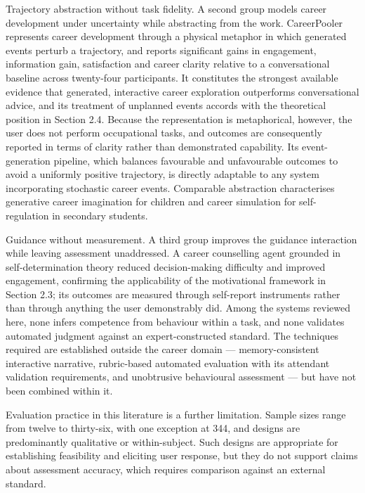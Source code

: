 Trajectory abstraction without task fidelity. A second group models career development under uncertainty while abstracting from the work. CareerPooler\cite{r79} represents career development through a physical metaphor in which generated events perturb a trajectory, and reports significant gains in engagement, information gain, satisfaction and career clarity relative to a conversational baseline across twenty-four participants. It constitutes the strongest available evidence that generated, interactive career exploration outperforms conversational advice, and its treatment of unplanned events accords with the theoretical position in Section 2.4. Because the representation is metaphorical, however, the user does not perform occupational tasks, and outcomes are consequently reported in terms of clarity rather than demonstrated capability. Its event-\allowbreak{}generation pipeline, which balances favourable and unfavourable outcomes to avoid a uniformly positive trajectory, is directly adaptable to any system incorporating stochastic career events. Comparable abstraction characterises generative career imagination for children\cite{r80} and career simulation for self-\allowbreak{}regulation in secondary students\cite{r81}.

Guidance without measurement. A third group improves the guidance interaction while leaving assessment unaddressed. A career counselling agent grounded in self-\allowbreak{}determination theory\cite{r82} reduced decision-\allowbreak{}making difficulty and improved engagement, confirming the applicability of the motivational framework in Section 2.3; its outcomes are measured through self-report instruments rather than through anything the user demonstrably did. Among the systems reviewed here, none infers competence from behaviour within a task, and none validates automated judgment against an expert-\allowbreak{}constructed standard. The techniques required are established outside the career domain --- memory-\allowbreak{}consistent interactive narrative\cite{r53,r56}, rubric-\allowbreak{}based automated evaluation with its attendant validation requirements\cite{r57,r59,r60}, and unobtrusive behavioural assessment\cite{r75} --- but have not been combined within it.

Evaluation practice in this literature is a further limitation. Sample sizes range from twelve to thirty-six, with one exception at 344, and designs are predominantly qualitative or within-\allowbreak{}subject. Such designs are appropriate for establishing feasibility and eliciting user response, but they do not support claims about assessment accuracy, which requires comparison against an external standard.

